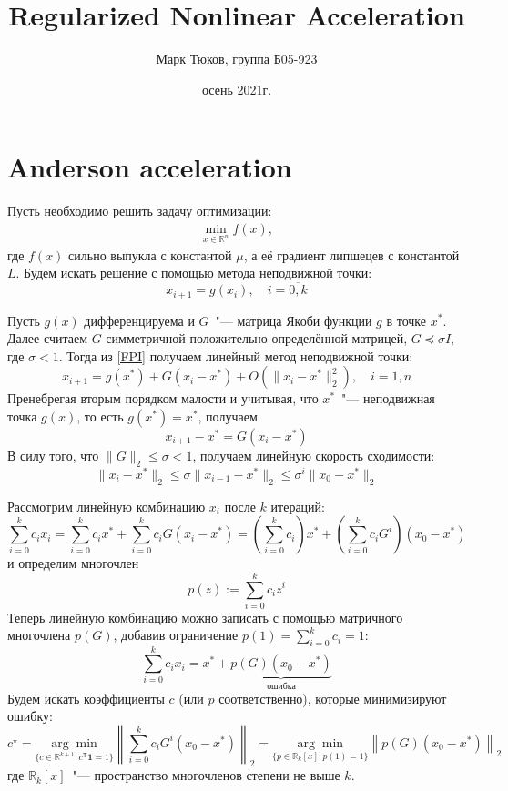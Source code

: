 \documentclass[12pt]{article}
\title{Regularized Nonlinear Acceleration}
\date{осень 2021г.}
\author{Марк Тюков, группа Б05-923}
\theoremstyle{definition}
\numberwithin{Def}{section}
\numberwithin{Th}{section}
\numberwithin{Prop}{section}
\numberwithin{St}{section}
\numberwithin{Cor}{section}
\begin{document}
\maketitle
\tableofcontents
\newpage

\section{Anderson acceleration}

Пусть необходимо решить задачу оптимизации:
\begin{align*}
	\min_{x\in \mathbb{R}^n} f(x),
\end{align*}
где $f(x)$ сильно выпукла с константой $\mu$, а её градиент липшецев с константой
$L$. Будем искать решение с помощью метода неподвижной точки:
\begin{equation}\label{FPI}
x_{i+1}=g(x_i),\quad i=\overline{0,k}
\end{equation}

Пусть $g(x)$ дифференцируема и $G$~"--- матрица Якоби функции $g$ в точке $x^*$.
Далее считаем $G$ симметричной положительно определённой матрицей,
$G\preceq\sigma I$, где $\sigma<1$. Тогда из \eqref{FPI} получаем
линейный метод неподвижной точки:
\begin{equation}\label{LFPI}
x_{i+1}=g(x^*)+G(x_i-x^*)+O\left(\|x_i-x^*\|^2_2\right),\quad i=\overline{1,n}
\end{equation}
Пренебрегая вторым порядком малости и учитывая, что $x^*$~"--- неподвижная точка
$g(x)$, то есть $g(x^*)=x^*$, получаем
$$
x_{i+1}-x^*=G(x_i-x^*)$$
В силу того, что $\|G\|_2\leqslant\sigma< 1$, получаем линейную скорость
сходимости:
\newcommand{\euc}[1]{\|#1\|_2}
$$
\euc{x_i-x^*}\leqslant \sigma\euc{x_{i-1}-x^*}\leqslant \sigma^i\euc{x_0-x^*}
$$

Рассмотрим линейную комбинацию $x_i$ после $k$ итераций:
$$
\sum_{i=0}^k c_ix_i=\sum_{i=0}^k c_ix^*+\sum_{i=0}^k c_iG(x_i-x^*)=
\left(\sum_{i=0}^k c_i\right)x^*+\left(\sum_{i=0}^k c_i G^i\right)(x_0-x^*)
$$
и определим многочлен
$$
p(z):=\sum_{i=0}^k c_iz^i
$$
Теперь линейную комбинацию можно записать с помощью матричного многочлена $p(G)$,
добавив ограничение $p(1)=\sum_{i=0}^kc_i=1$:
\begin{equation}\label{error_term}
\sum_{i=0}^kc_ix_i=x^*+\underbrace{p(G)(x_0-x^*)}_{\text{ошибка}}
\end{equation}
Будем искать коэффициенты $c$ (или $p$ соответственно), которые минимизируют
ошибку:
$$
c^\star=\underset{\{c\in\mathbb{R}^{k+1}:c^\mathsf{T}\mathbf{1}=1\}}
{\arg\min}\left\|\sum_{i=0}^kc_iG^i(x_0-x^*)\right\|_2=
\underset{\{p\in\mathbb{R}_k[x]:p(1)=1\}}
{\arg\min}\left\|p(G)(x_0-x^*)\right\|_2
$$
где $\mathbb{R}_k[x]$~"--- пространство многочленов степени не выше $k$.
\end{document}
